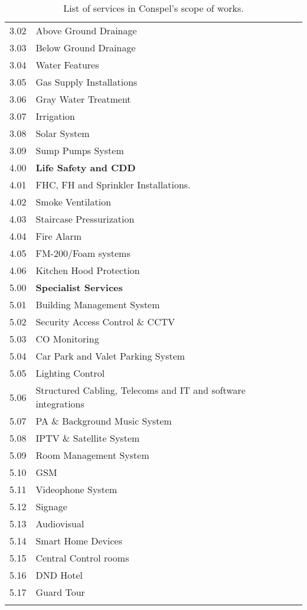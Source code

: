 {\begin{longtable}[l]{l >{\RaggedRight}p{5.5cm}lp{5cm}@{}}
3.02	&Above Ground Drainage & & \\		
3.03	&Below Ground Drainage  & & \\		
3.04	&Water Features	     & &  \\	
3.05	&Gas Supply Installations	& & \\	
3.06  	& Gray Water Treatment & & \\
3.07  	& Irrigation &&\\
3.08  	& Solar System &&\\
3.09 	& Sump Pumps System &&\\
\midrule		
4.00	&\textbf{Life Safety and CDD} &&\\	
4.01	&FHC, FH and Sprinkler Installations.	&&  \\	
4.02	&Smoke Ventilation		& & \\
4.03	&Staircase Pressurization          & & \\		
4.04	&Fire Alarm		& &  \\
4.05	&FM-200/Foam systems		& &               \\
4.06  	&Kitchen Hood Protection            & & \\

\midrule
5.00	&\textbf{Specialist Services}		&&\\
5.01	&Building Management System	& & \\	
5.02	&Security Access Control \& CCTV& & \\	
5.03	&CO Monitoring		&  & \\
5.04	&Car Park and Valet Parking System	& & \\

5.05	&Lighting Control		& & \\

5.06	&Structured Cabling, Telecoms and IT	and software integrations	& &\\

5.07	&PA \& Background Music System & & \\		
5.08	&IPTV \& Satellite System	& & \\	
5.09	&Room Management System	& & \\
5.10  	&GSM                                       & &\\
5.11  	&Videophone System                 & &\\
5.12  	&Signage                                  &&\\
5.13  	&Audiovisual                              &&\\ 
5.14  	&Smart Home Devices                &&\\
5.15  	&Central Control rooms              &&\\
5.16  	&DND Hotel                                &&\\
5.17  	&Guard Tour                             &&\\
\bottomrule

\caption{List of services in Conspel's scope of works.}		

\end{longtable}
}

